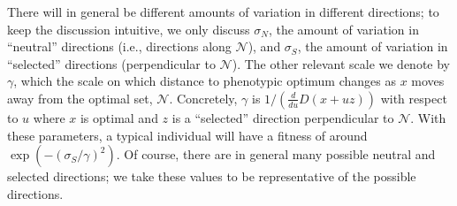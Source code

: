 \documentclass{article}
\newcommand{\1}{\mathbbm{1}}
\newcommand{\allS}{\mathcal{N}}
\begin{document}

There will in general be different amounts of variation in different directions;
to keep the discussion intuitive, we only discuss $\sigma_N$, the amount of variation in ``neutral'' directions
(i.e., directions along $\allS$),
and $\sigma_S$, the amount of variation in ``selected'' directions (perpendicular to $\allS$).
The other relevant scale we denote by $\gamma$,
which the scale on which distance to phenotypic optimum changes as $x$ moves away from the optimal set, $\allS$.
Concretely, $\gamma$ is
$1/(\frac{d}{du}D(x+uz))$ 
with respect to $u$ where $x$ is optimal and $z$ is a ``selected'' direction perpendicular to $\allS$.
With these parameters, a typical individual will have a fitness of around $\exp(-(\sigma_S/\gamma)^2)$.
Of course, there are in general many possible neutral and selected directions;
we take these values to be representative of the possible directions.
\end{document}
